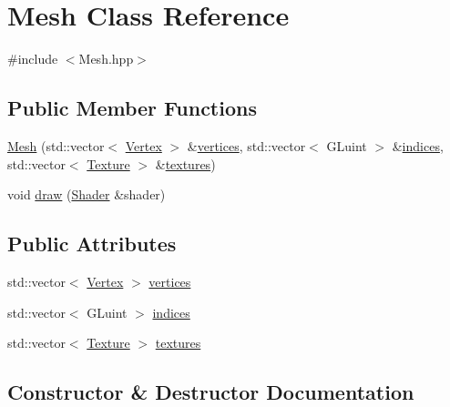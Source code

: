 \hypertarget{classMesh}{}\section{Mesh Class Reference}
\label{classMesh}


{\ttfamily \#include $<$Mesh.\+hpp$>$}

\subsection*{Public Member Functions}
\begin{DoxyCompactItemize}
\item 
\hyperlink{classMesh_a3a7b7bb4a172a517e86e197b267f324d}{Mesh} (std\+::vector$<$ \hyperlink{structVertex}{Vertex} $>$ \&\hyperlink{classMesh_a6465a888c97232a39e12aad008c969c3}{vertices}, std\+::vector$<$ G\+Luint $>$ \&\hyperlink{classMesh_a5e55b84c6c967608bcf23ed7d68e4215}{indices}, std\+::vector$<$ \hyperlink{classTexture}{Texture} $>$ \&\hyperlink{classMesh_abf1e672703bf4f8e104f3b076faaf958}{textures})
\item 
void \hyperlink{classMesh_a431399cb5c25cc84cdf8c8e59a957585}{draw} (\hyperlink{classShader}{Shader} \&shader)
\end{DoxyCompactItemize}
\subsection*{Public Attributes}
\begin{DoxyCompactItemize}
\item 
std\+::vector$<$ \hyperlink{structVertex}{Vertex} $>$ \hyperlink{classMesh_a6465a888c97232a39e12aad008c969c3}{vertices}
\item 
std\+::vector$<$ G\+Luint $>$ \hyperlink{classMesh_a5e55b84c6c967608bcf23ed7d68e4215}{indices}
\item 
std\+::vector$<$ \hyperlink{classTexture}{Texture} $>$ \hyperlink{classMesh_abf1e672703bf4f8e104f3b076faaf958}{textures}
\end{DoxyCompactItemize}


\subsection{Constructor \& Destructor Documentation}
